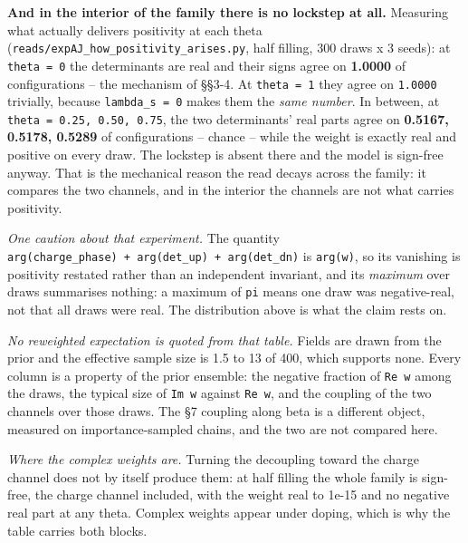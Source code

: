 \documentclass[10pt,letterpaper,twocolumn]{article}
\begin{document}
\textbf{And in the interior of the family there is no lockstep at all.} Measuring what actually delivers
positivity at each theta (\texttt{reads/\allowbreak{}expAJ\_\allowbreak{}how\_\allowbreak{}positivity\_\allowbreak{}arises.\allowbreak{}py}, half filling, 300 draws x 3
seeds): at \texttt{theta\ =\allowbreak{}\ 0} the determinants are real and their signs agree on \textbf{1.0000} of
configurations -- the mechanism of §§3-4. At \texttt{theta\ =\allowbreak{}\ 1} they agree on \texttt{1.\allowbreak{}0000} trivially, because
\texttt{lambda\_\allowbreak{}s\ =\allowbreak{}\ 0} makes them the \emph{same number}. In between, at \texttt{theta\ =\allowbreak{}\ 0.\allowbreak{}25,\allowbreak{}\ 0.\allowbreak{}50,\allowbreak{}\ 0.\allowbreak{}75}, the two
determinants' real parts agree on \textbf{0.5167, 0.5178, 0.5289} of configurations -- chance -- while
the weight is exactly real and positive on every draw. The lockstep is absent there and the model
is sign-free anyway. That is the mechanical reason the read decays across the family: it compares
the two channels, and in the interior the channels are not what carries positivity.

\emph{One caution about that experiment.} The quantity \texttt{arg(\allowbreak{}charge\_\allowbreak{}phase)\allowbreak{}\ +\allowbreak{}\ arg(\allowbreak{}det\_\allowbreak{}up)\allowbreak{}\ +\allowbreak{}\ arg(\allowbreak{}det\_\allowbreak{}dn)\allowbreak{}}
is \texttt{arg(\allowbreak{}w)\allowbreak{}}, so its vanishing is positivity restated rather than an independent invariant, and its
\emph{maximum} over draws summarises nothing: a maximum of \texttt{pi} means one draw was negative-real, not
that all draws were real. The distribution above is what the claim rests on.

\emph{No reweighted expectation is quoted from that table.} Fields are drawn from the prior and the
effective sample size is 1.5 to 13 of 400, which supports none. Every column is a property of the
prior ensemble: the negative fraction of \texttt{Re\ w} among the draws, the typical size of \texttt{Im\ w} against
\texttt{Re\ w}, and the coupling of the two channels over those draws. The §7 coupling along beta is a
different object, measured on importance-sampled chains, and the two are not compared here.

\emph{Where the complex weights are.} Turning the decoupling toward the charge channel does not by
itself produce them: at half filling the whole family is sign-free, the charge channel included,
with the weight real to 1e-15 and no negative real part at any theta. Complex weights appear under
doping, which is why the table carries both blocks.
\end{document}
